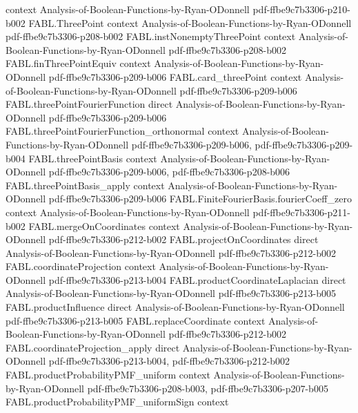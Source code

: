 \begin{theorem}
  {context}
  {Analysis-of-Boolean-Functions-by-Ryan-ODonnell}
  {pdf-ffbe9c7b3306-p210-b002}
\proofstep
  {FABL.ThreePoint}
  {context}
  {Analysis-of-Boolean-Functions-by-Ryan-ODonnell}
  {pdf-ffbe9c7b3306-p208-b002}
\proofstep
  {FABL.instNonemptyThreePoint}
  {context}
  {Analysis-of-Boolean-Functions-by-Ryan-ODonnell}
  {pdf-ffbe9c7b3306-p208-b002}
\proofstep
  {FABL.finThreePointEquiv}
  {context}
  {Analysis-of-Boolean-Functions-by-Ryan-ODonnell}
  {pdf-ffbe9c7b3306-p209-b006}
\proofstep
  {FABL.card_threePoint}
  {context}
  {Analysis-of-Boolean-Functions-by-Ryan-ODonnell}
  {pdf-ffbe9c7b3306-p209-b006}
\proofstep
  {FABL.threePointFourierFunction}
  {direct}
  {Analysis-of-Boolean-Functions-by-Ryan-ODonnell}
  {pdf-ffbe9c7b3306-p209-b006}
\proofstep
  {FABL.threePointFourierFunction_orthonormal}
  {context}
  {Analysis-of-Boolean-Functions-by-Ryan-ODonnell}
  {pdf-ffbe9c7b3306-p209-b006,
    pdf-ffbe9c7b3306-p209-b004}
\proofstep
  {FABL.threePointBasis}
  {context}
  {Analysis-of-Boolean-Functions-by-Ryan-ODonnell}
  {pdf-ffbe9c7b3306-p209-b006,
    pdf-ffbe9c7b3306-p208-b006}
\proofstep
  {FABL.threePointBasis_apply}
  {context}
  {Analysis-of-Boolean-Functions-by-Ryan-ODonnell}
  {pdf-ffbe9c7b3306-p209-b006}
\proofstep
  {FABL.FiniteFourierBasis.fourierCoeff_zero}
  {context}
  {Analysis-of-Boolean-Functions-by-Ryan-ODonnell}
  {pdf-ffbe9c7b3306-p211-b002}
\proofstep
  {FABL.mergeOnCoordinates}
  {context}
  {Analysis-of-Boolean-Functions-by-Ryan-ODonnell}
  {pdf-ffbe9c7b3306-p212-b002}
\proofstep
  {FABL.projectOnCoordinates}
  {direct}
  {Analysis-of-Boolean-Functions-by-Ryan-ODonnell}
  {pdf-ffbe9c7b3306-p212-b002}
\proofstep
  {FABL.coordinateProjection}
  {context}
  {Analysis-of-Boolean-Functions-by-Ryan-ODonnell}
  {pdf-ffbe9c7b3306-p213-b004}
\proofstep
  {FABL.productCoordinateLaplacian}
  {direct}
  {Analysis-of-Boolean-Functions-by-Ryan-ODonnell}
  {pdf-ffbe9c7b3306-p213-b005}
\proofstep
  {FABL.productInfluence}
  {direct}
  {Analysis-of-Boolean-Functions-by-Ryan-ODonnell}
  {pdf-ffbe9c7b3306-p213-b005}
\proofstep
  {FABL.replaceCoordinate}
  {context}
  {Analysis-of-Boolean-Functions-by-Ryan-ODonnell}
  {pdf-ffbe9c7b3306-p212-b002}
\proofstep
  {FABL.coordinateProjection_apply}
  {direct}
  {Analysis-of-Boolean-Functions-by-Ryan-ODonnell}
  {pdf-ffbe9c7b3306-p213-b004,
    pdf-ffbe9c7b3306-p212-b002}
\proofstep
  {FABL.productProbabilityPMF_uniform}
  {context}
  {Analysis-of-Boolean-Functions-by-Ryan-ODonnell}
  {pdf-ffbe9c7b3306-p208-b003,
    pdf-ffbe9c7b3306-p207-b005}
\proofstep
  {FABL.productProbabilityPMF_uniformSign}
  {context}

\end{theorem}

